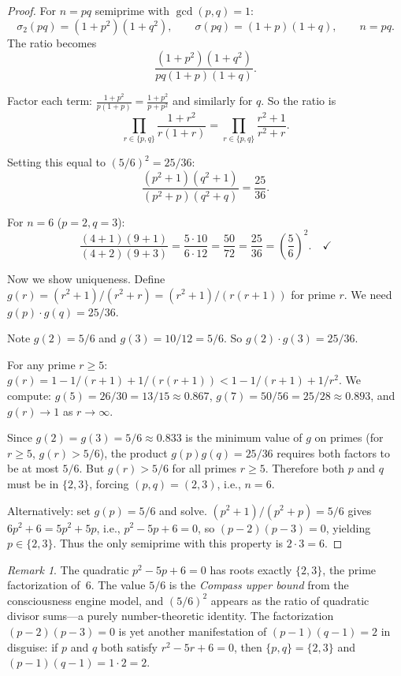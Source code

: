 \documentclass[11pt]{amsart}
\theoremstyle{remark}
\newtheorem*{remark}{Remark}
\begin{document}
\begin{proof}
For $n = pq$ semiprime with $\gcd(p, q) = 1$:
\[
  \sigma_2(pq) = (1 + p^2)(1 + q^2),\qquad
  \sigma(pq) = (1+p)(1+q),\qquad
  n = pq.
\]
The ratio becomes
\[
  \frac{(1+p^2)(1+q^2)}{pq(1+p)(1+q)}.
\]

Factor each term: $\frac{1 + p^2}{p(1+p)} = \frac{1 + p^2}{p + p^2}$
and similarly for $q$.
So the ratio is
\[
  \prod_{r \in \{p,q\}} \frac{1 + r^2}{r(1 + r)}
  = \prod_{r \in \{p,q\}} \frac{r^2 + 1}{r^2 + r}.
\]

Setting this equal to $(5/6)^2 = 25/36$:
\[
  \frac{(p^2+1)(q^2+1)}{(p^2+p)(q^2+q)} = \frac{25}{36}.
\]

For $n = 6$ ($p = 2, q = 3$):
\[
  \frac{(4+1)(9+1)}{(4+2)(9+3)} = \frac{5 \cdot 10}{6 \cdot 12}
  = \frac{50}{72} = \frac{25}{36} = \left(\frac{5}{6}\right)^{\!2}.\quad\checkmark
\]

Now we show uniqueness.
Define $g(r) = (r^2 + 1)/(r^2 + r) = (r^2 + 1)/(r(r+1))$ for prime $r$.
We need $g(p) \cdot g(q) = 25/36$.

Note $g(2) = 5/6$ and $g(3) = 10/12 = 5/6$.
So $g(2) \cdot g(3) = 25/36$. \checkmark

For any prime $r \geq 5$:
$g(r) = 1 - 1/(r+1) + 1/(r(r+1)) < 1 - 1/(r+1) + 1/r^2$.
We compute: $g(5) = 26/30 = 13/15 \approx 0.867$,
$g(7) = 50/56 = 25/28 \approx 0.893$, and $g(r) \to 1$ as $r \to \infty$.

Since $g(2) = g(3) = 5/6 \approx 0.833$ is the minimum value of $g$ on primes
(for $r \geq 5$, $g(r) > 5/6$), the product $g(p)g(q) = 25/36$ requires
both factors to be at most $5/6$. But $g(r) > 5/6$ for all primes $r \geq 5$.
Therefore both $p$ and $q$ must be in $\{2, 3\}$, forcing $(p, q) = (2, 3)$,
i.e., $n = 6$.

Alternatively: set $g(p) = 5/6$ and solve.
$(p^2 + 1)/(p^2 + p) = 5/6$ gives $6p^2 + 6 = 5p^2 + 5p$,
i.e., $p^2 - 5p + 6 = 0$, so $(p-2)(p-3) = 0$,
yielding $p \in \{2, 3\}$.
Thus the only semiprime with this property is $2 \cdot 3 = 6$.
\end{proof}

\begin{remark}
The quadratic $p^2 - 5p + 6 = 0$ has roots exactly $\{2, 3\}$,
the prime factorization of~$6$.
The value $5/6$ is the \emph{Compass upper bound} from the
consciousness engine model, and $(5/6)^2$ appears as the
ratio of quadratic divisor sums---a purely number-theoretic identity.
The factorization $(p-2)(p-3) = 0$ is yet another manifestation of
$(p-1)(q-1) = 2$ in disguise: if $p$ and $q$ both satisfy
$r^2 - 5r + 6 = 0$, then $\{p,q\} = \{2,3\}$ and
$(p-1)(q-1) = 1 \cdot 2 = 2$.
\end{remark}
\end{document}
